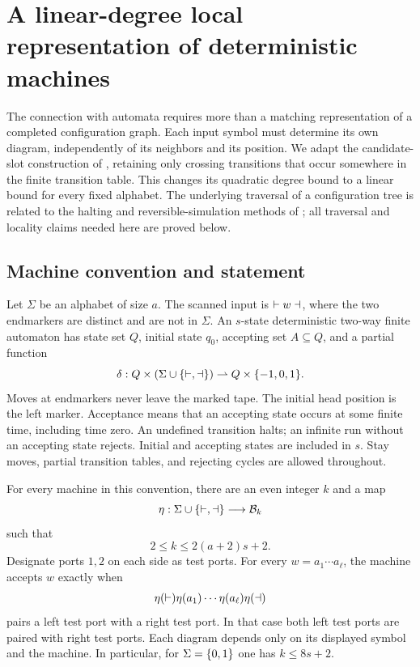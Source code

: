 \section{A linear-degree local representation of deterministic machines}
\label{btc:mach:section}

The connection with automata requires more than a matching representation
of a completed configuration graph. Each input symbol must determine its
own diagram, independently of its neighbors and its position. We adapt the
candidate-slot construction of \cite{OpenAILiveness2026}, retaining only
crossing transitions that occur somewhere in the finite transition table.
This changes its quadratic degree bound to a linear bound for every fixed
alphabet. The underlying traversal of a configuration tree is related to
the halting and reversible-simulation methods of
\cite{SipserHalting1980,LangeMcKenzieTapp2000}; all traversal and locality
claims needed here are proved below.

\subsection{Machine convention and statement}

Let $\Sigma$ be an alphabet of size $a$. The scanned input is
$\vdash w\dashv$, where the two endmarkers are distinct and are not in
$\Sigma$. An $s$-state deterministic two-way finite automaton has state
set $Q$, initial state $q_0$, accepting set $A\subseteq Q$, and a partial
function
\[
 \delta:Q\times(\Sigma\cup\{\vdash,\dashv\})
 \rightharpoonup Q\times\{-1,0,1\}.
\]
Moves at endmarkers never leave the marked tape. The initial head position
is the left marker. Acceptance means that an accepting state occurs at
some finite time, including time zero. An undefined transition halts; an
infinite run without an accepting state rejects. Initial and accepting
states are included in $s$. Stay moves, partial transition tables, and
rejecting cycles are allowed throughout.

\begin{theorem}\label{btc:mach:representation}
For every machine in this convention, there are an even integer $k$ and
a map
\[
 \eta:\Sigma\cup\{\vdash,\dashv\}\longrightarrow\mathcal{B}_{k}
\]
such that
\begin{equation}\label{btc:mach:degree-bound}
 2\le k\le 2(a+2)s+2.
\end{equation}
Designate ports $1,2$ on each side as test ports. For every
$w=a_1\cdots a_\ell$, the machine accepts $w$ exactly when
\begin{equation}\label{btc:mach:whole-diagram}
 \eta(\vdash)\eta(a_1)\cdots\eta(a_\ell)\eta(\dashv)
\end{equation}
pairs a left test port with a right test port. In that case both left
test ports are paired with right test ports. Each diagram depends only
on its displayed symbol and the machine. In particular, for
$\Sigma=\{0,1\}$ one has $k\le8s+2$.
\end{theorem}

